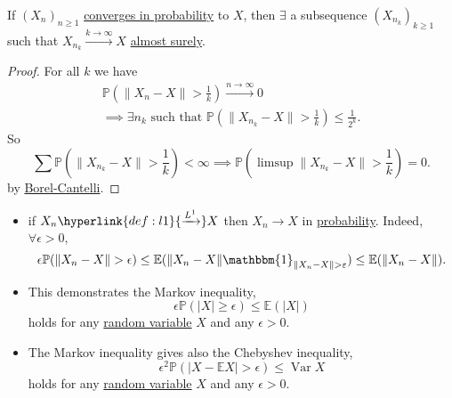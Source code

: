 \documentclass{article}
\newcommand{\1}[1]{\mathbbm{1}_{#1}}
\newcommand{\Prob}{\mathbb{P}}
\newcommand{\E}{\mathbb{E}}
\DeclareMathOperator{\Var}{Var}
\begin{document}
\begin{prop}
    If $(X_n)_{n \geq 1}$ \hyperlink{def:conv}{converges in probability} to $X$, then $\exists$ a subsequence $(X_{n_k})_{k \geq 1}$ such that $X_{n_k} \xrightarrow{k \to \infty} X$ \hyperlink{def:conv}{almost surely}.
\end{prop}
\begin{proof}
    For all $k$ we have
    \begin{gather*}
        \Prob\left(\|X_n - X\| > \frac{1}{k}\right) \xrightarrow{n \to \infty} 0\\
        \implies \exists n_k \text{ such that } \mathbb{P}\left(\|X_{n_k}-X\| > \frac{1}{k}\right) \leq \frac{1}{2^k}.
    \end{gather*}
    So
    \begin{equation*}
        \sum \mathbb{P}\left(\|X_{n_k}-X\| > \frac{1}{k}\right) < \infty \implies \mathbb{P}\left(\limsup \|X_{n_k} - X\| > \frac{1}{k}\right) = 0.
    \end{equation*}
    by \hyperlink{lem:bc1}{Borel-Cantelli}.
\end{proof}


\begin{remark}\leavevmode
    \begin{itemize}
        \item if $X_n \hyperlink{def:l1}{\xrightarrow{L^1}} X$ then $X_n \to X$ in \hyperlink{def:conv}{probability}. Indeed, $\forall \epsilon>0$,
            \begin{equation*}
                    \epsilon \Prob(\|X_n-X\| > \epsilon) \leq \E(\|X_n - X\| \1{\|X_n-X\|>\varepsilon}) \leq \E(\|X_n-X\|).
            \end{equation*}
        \item This demonstrates the Markov inequality,
            \begin{equation*}
                    \epsilon\Prob(|X| \geq \epsilon) \leq \E(|X|)
            \end{equation*}
            holds for any \hyperlink{def:rv}{random variable} $X$ and any $\epsilon > 0$.
        \item The Markov inequality gives also the Chebyshev inequality,
            \begin{equation*}
                    \epsilon^2 \Prob(|X-\E X| > \epsilon) \leq \Var X
            \end{equation*}
            holds for any \hyperlink{def:rv}{random variable} $X$ and any $\epsilon > 0$.
    \end{itemize}
\end{remark}
\end{document}

